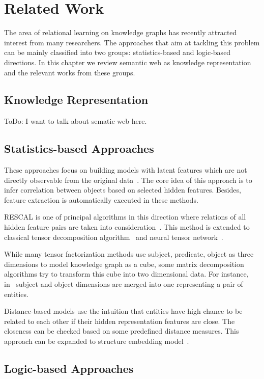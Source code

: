 \chapter{Related Work}

The area of relational learning on knowledge graphs has recently attracted interest from many researchers. The approaches that aim at tackling this problem can be mainly classified into two groups: statistics-based and logic-based directions. In this chapter we review semantic web as knowledge representation and the relevant works from these groups.

\section{Knowledge Representation}

ToDo: I want to talk about sematic web here.

\section{Statistics-based Approaches}

These approaches focus on building models with latent features which are not directly observable from the original data~\cite{ref1}. The core idea of this approach is to infer correlation between objects based on selected hidden features. Besides, feature extraction is automatically executed in these methods.

RESCAL is one of principal algorithms in this direction where relations of all hidden feature pairs are taken into consideration~\cite{ref2, ref3}. This method is extended to classical tensor decomposition algorithm~\cite{ref4} and neural tensor network~\cite{ref5}.

While many tensor factorization methods use subject, predicate, object as three dimensions to model knowledge graph as a cube, some matrix decomposition algorithms try to transform this cube into two dimensional data. For instance, in~\cite{ref6, ref7} subject and object dimensions are merged into one representing a pair of entities.

Distance-based models use the intuition that entities have high chance to be related to each other if their hidden representation features are close. The closeness can be checked based on some predefined distance measures. This approach can be expanded to structure embedding model~\cite{ref8}.

\section{Logic-based Approaches}

